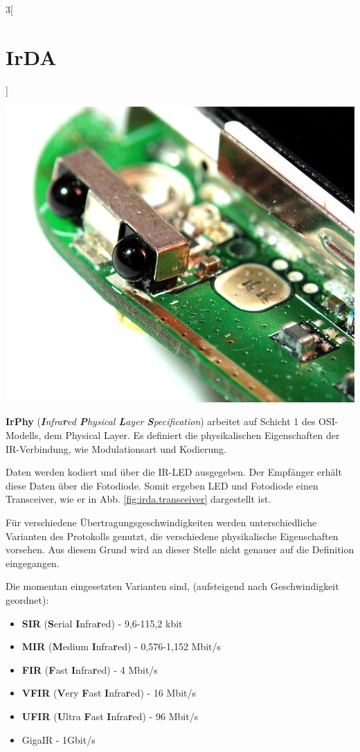 \begin{multicols}{3}[\section{IrDA}]
\begin{Figure}
\includegraphics[width=\linewidth]{Kapitel/IrDA/Grafiken/irda_trans.jpg}
\label{fig:irda.transceiver}
\end{Figure}
\textbf{IrPhy} (\textit{\textbf{I}nfra\textbf{r}ed \textbf{P}hysical \textbf{L}ayer \textbf{S}pecification}) arbeitet auf Schicht 1 des OSI-Modells, dem Physical Layer. Es definiert die physikalischen Eigenschaften der IR-Verbindung, wie Modulationsart und Kodierung.

Daten werden kodiert und über die IR-LED ausgegeben. Der Empfänger erhält diese Daten über die Fotodiode. Somit ergeben LED und Fotodiode einen Transceiver, wie er in Abb. \ref{fig:irda.transceiver} dargestellt ist.

Für verschiedene Übertragungsgeschwindigkeiten werden unterschiedliche Varianten des Protokolls genutzt, die verschiedene physikalische Eigenschaften vorsehen. Aus diesem Grund wird an dieser Stelle nicht genauer auf die Definition eingegangen.

Die momentan eingesetzten Varianten sind, (aufsteigend nach Geschwindigkeit geordnet):

\begin{itemize}
	\item \textbf{SIR} (\textbf{S}erial \textbf{I}nfra\textbf{r}ed) - 9,6-115,2 kbit
	\item \textbf{MIR} (\textbf{M}edium \textbf{I}nfra\textbf{r}ed) - 0,576-1,152 Mbit/s
	\item \textbf{FIR} (\textbf{F}ast \textbf{I}nfra\textbf{r}ed) - 4 Mbit/s
	\item \textbf{VFIR} (\textbf{V}ery \textbf{F}ast \textbf{I}nfra\textbf{r}ed) - 16 Mbit/s
	\item \textbf{UFIR} (\textbf{U}ltra \textbf{F}ast \textbf{I}nfra\textbf{r}ed) - 96 Mbit/s
	\item GigaIR - 1Gbit/s~\cite{wikipediaen}
\end{itemize}


\end{multicols}
